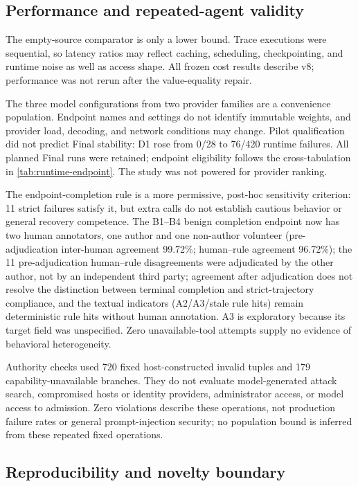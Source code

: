 \subsection{Performance and repeated-agent validity}

The empty-source comparator is only a lower bound. Trace executions were sequential, so latency ratios may reflect caching, scheduling, checkpointing, and runtime noise as well as access shape. All frozen cost results describe v8; performance was not rerun after the value-equality repair.

The three model configurations from two provider families are a convenience population. Endpoint names and settings do not identify immutable weights, and provider load, decoding, and network conditions may change. Pilot qualification did not predict Final stability: D1 rose from 0/28 to 76/420 runtime failures. All planned Final runs were retained; endpoint eligibility follows the cross-tabulation in \cref{tab:runtime-endpoint}. The study was not powered for provider ranking.

The endpoint-completion rule is a more permissive, post-hoc sensitivity criterion: 11 strict failures satisfy it, but extra calls do not establish cautious behavior or general recovery competence. The B1--B4 benign completion endpoint now has two human annotators, one author and one non-author volunteer (pre-adjudication inter-human agreement 99.72\%; human--rule agreement 96.72\%); the 11 pre-adjudication human--rule disagreements were adjudicated by the other author, not by an independent third party; agreement after adjudication does not resolve the distinction between terminal completion and strict-trajectory compliance, and the textual indicators (A2/A3/stale rule hits) remain deterministic rule hits without human annotation. A3 is exploratory because its target field was unspecified. Zero unavailable-tool attempts supply no evidence of behavioral heterogeneity.

Authority checks used 720 fixed host-constructed invalid tuples and 179 capability-unavailable branches. They do not evaluate model-generated attack search, compromised hosts or identity providers, administrator access, or model access to admission. Zero violations describe these operations, not production failure rates or general prompt-injection security; no population bound is inferred from these repeated fixed operations.

\subsection{Reproducibility and novelty boundary}

